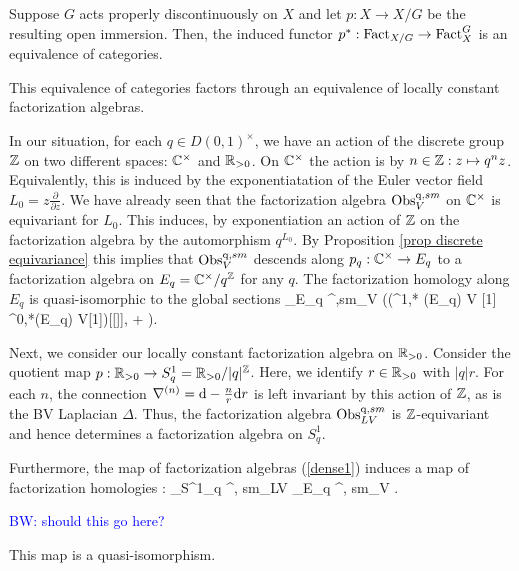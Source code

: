 \documentclass[10pt]{amsart}
\def\brian{\textcolor{blue}{BW: }\textcolor{blue}}
\begin{document}
\begin{prop}[\cite{CG} Proposition \brian{??}] \label{prop discrete equivariance}Suppose $G$ acts properly discontinuously on $X$ and let $p : X \to X / G$ be the resulting open immersion.
Then, the induced functor $p^* : {\rm Fact}_{X/G} \to {\rm Fact}_{X}^{G}$ is an equivalence of categories.
\end{prop}

\begin{rmk}
This equivalence of categories factors through an equivalence of locally constant factorization algebras.
\end{rmk}

In our situation, for each $q \in D(0,1)^\times$, we have an action of the discrete group $\mathbb Z$ on two different spaces: $\mathbb C^\times$ and $\mathbb R_{>0}$.
On $\mathbb C^\times$ the action is by $n \in \mathbb Z : z \mapsto q^n z$.
Equivalently, this is induced by the exponentiatation of the Euler vector field $L_0 = z \frac{\partial}{\partial z}$. 
We have already seen that the factorization algebra ${\rm Obs}^{{\rm q}, sm}_{V}$ on $\mathbb C^\times$ is equivariant for $L_0$.
This induces, by exponentiation an action of $\mathbb Z$ on the factorization algebra by the automorphism $q^{L_0}$. 
By Proposition \ref{prop discrete equivariance} this implies that ${\rm Obs}^{{\rm q},sm}_{V}$ descends along $p_q : \mathbb C^\times \to E_q$ to a factorization algebra on $E_q = \mathbb C^\times / q^\mathbb Z$ for any $q$.
The factorization homology along $E_q$ is quasi-isomorphic to the global sections 
\ben
\int_{E_q} \Obs^{\q,sm}_{V} \simeq \left(\Sym(\Omega^{1,*} (E_q) \otimes V [1] \oplus \Omega^{0,*}(E_q) \otimes V[1])[[\hbar]], \dbar + \hbar \Delta \right). 
\een

Next, we consider our locally constant factorization algebra on $\mathbb R_{>0}$.
Consider the quotient map $p : \mathbb R_{>0} \to S_q^1 = \mathbb R_{>0} / |q|^\mathbb Z$. 
Here, we identify $r \in \mathbb R_{>0}$ with $|q| r$. 
For each $n$, the connection $\nabla^{(n)} = {\rm d} - \frac{n}{r} {\rm d} r$ is left invariant by this action of $\mathbb Z$, as is the BV Laplacian $\Delta$.
Thus, the factorization algebra ${\rm Obs}^{{\rm q},sm}_{LV}$ is $\mathbb Z$-equivariant and hence determines a factorization algebra on $S^1_q$. 

Furthermore, the map of factorization algebras (\ref{dense1}) induces a map of factorization homologies
\ben
\iota : \int_{S^1_q} \Obs^{\q, sm}_{LV} \to \int_{E_q} \Obs^{\q, sm}_{V} .
\een

\brian{should this go here?}
\begin{lem} 
This map is a quasi-isomorphism.
\end{lem}
\end{document}
